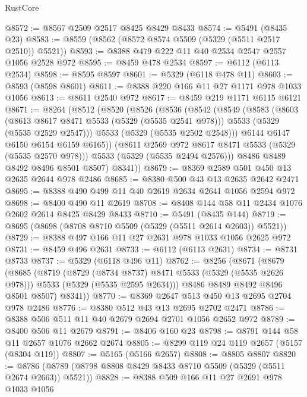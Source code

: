 \begin{lexlean}{RustCore}
\begin{coremodule}
@8572 := @8567 @2509 @2517 @8425 @8429 @8433
@8574 := @5491 (@8435 @23)
@8583 := @8559 (@8562 (@8572 @8574 @5509 (@5329 (@5511 @2517 @2510)) @5521))
@8593 := @8388 @479 @222 @11 @40 @2534 @2547 @2557 @1056 @2528 @972
@8595 := @8459 @478 @2534
@8597 := @6112 (@6113 @2534)
@8598 := @8595 @8597
@8601 := @5329 (@6118 @478 @11)
@8603 := @8593 (@8598 @8601)
@8611 := @8388 @220 @166 @11 @27 @1171 @978 @1033 @1056
@8613 := @8611 @2540 @972
@8617 := @8459 @219 @1171 @6115 @6121
@8671 := @8264
    (@8512
      (@8520
        (@8526
          (@8536
            (@8542
              (@8549
                (@8583
                  (@8603
                    (@8613 @8617 @8471 @5533 (@5329 (@5535 @2541 @978)))
                    @5533
                    (@5329 (@5535 @2529 @2547)))
                  @5533
                  (@5329 (@5535 @2502 @2548)))
                @6144
                @6147
                @6150
                @6154
                @6159
                @6165))
            (@8611 @2569 @972 @8617 @8471 @5533 (@5329 (@5535 @2570 @978)))
            @5533
            (@5329 (@5535 @2494 @2576)))
          @8486
          @8489
          @8492
          @8496
          @8501
          @8507)
        @8341))
@8679 := @8369 @2589 @501 @450 @13 @2635 @2644 @978 @2486
@8685 := @8380 @500 @43 @13 @2635 @2642 @2471
@8695 := @8388 @490 @499 @11 @40 @2619 @2634 @2641 @1056 @2594 @972
@8698 := @8400 @490 @11 @2619
@8708 := @8408 @144 @58 @11 @2434 @1076 @2602 @2614 @8425 @8429 @8433
@8710 := @5491 (@8435 @144)
@8719 := @8695 (@8698 (@8708 @8710 @5509 (@5329 (@5511 @2614 @2603)) @5521))
@8729 := @8388 @497 @166 @11 @27 @2631 @978 @1033 @1056 @2625 @972
@8731 := @8459 @496 @2631
@8733 := @6112 (@6113 @2631)
@8734 := @8731 @8733
@8737 := @5329 (@6118 @496 @11)
@8762 := @8256
    (@8671
      (@8679
        (@8685
          (@8719
            (@8729 (@8734 @8737) @8471 @5533 (@5329 (@5535 @2626 @978)))
            @5533
            (@5329 (@5535 @2595 @2634)))
          @8486
          @8489
          @8492
          @8496
          @8501
          @8507)
        @8341))
@8770 := @8369 @2647 @513 @450 @13 @2695 @2704 @978 @2486
@8776 := @8380 @512 @43 @13 @2695 @2702 @2471
@8786 := @8388 @506 @511 @11 @40 @2679 @2694 @2701 @1056 @2652 @972
@8789 := @8400 @506 @11 @2679
@8791 := @8406 @160 @23
@8798 := @8791 @144 @58 @11 @2657 @1076 @2662 @2674
@8805 := @8299 @119 @24 @119 @2657 (@5157 (@8304 @119))
@8807 := @5165 (@5166 @2657)
@8808 := @8805 @8807
@8820 := @8786 (@8789 (@8798 @8808 @8429 @8433 @8710 @5509 (@5329 (@5511 @2674 @2663)) @5521))
@8828 := @8388 @509 @166 @11 @27 @2691 @978 @1033 @1056

\end{coremodule}
\end{lexlean}
